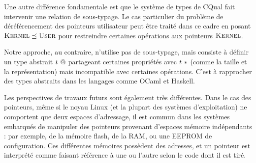 Une autre différence fondamentale est que le système de types de CQual fait
intervenir une relation de sous-typage. Le cas particulier du problème de
déréférencement des pointeurs utilisateur peut être traité dans ce cadre en
posant $\textsc{Kernel} \preceq \textsc{User}$ pour restreindre certaines opérations aux
pointeurs $\textsc{Kernel}$.

Notre approche, au contraire, n'utilise pas de sous-typage, mais consiste à
définir un type abstrait $t~@$ partageant certaines propriétés avec
$t~*$ (comme la taille et la représentation) mais incompatible avec
certaines opérations. C'est à rapprocher des types abstraits dans les langages
comme OCaml et Haskell.


Les perspectives de travaux futurs sont également très différentes. Dans le cas
des pointeurs, même si le noyau Linux (et la plupart des systèmes
d'exploitation) ne comportent que deux espaces d'adressage, il est commun dans
les systèmes embarqués de manipuler des pointeurs provenant d'espaces mémoire
indépendants : par exemple, de la mémoire flash, de la RAM, ou une EEPROM de
configuration. Ces différentes mémoires possèdent des adresses, et un pointeur
est interprété comme faisant référence à une ou l'autre selon le code dont il
est tiré.

